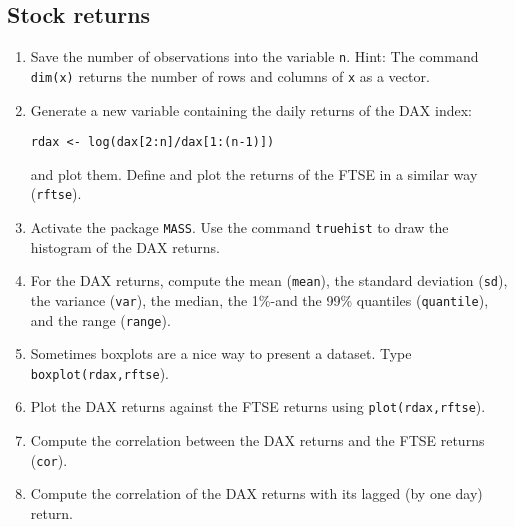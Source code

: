 \documentclass{article}
\begin{document}
\subsection{Stock returns}

\begin{enumerate}\setlength{\itemsep}{-1pt}
\item Save the number of observations into the variable \texttt{n}. Hint: The command \texttt{dim(x)} returns the number of rows and columns of \texttt{x} as a vector.
\item Generate a new variable containing the daily returns of the DAX index:

    \texttt{rdax <- log(dax[2:n]/dax[1:(n-1)])}

     and plot them. Define and plot the returns of the FTSE in a similar way (\texttt{rftse}).

\item Activate the package \texttt{MASS}. Use the command \texttt{truehist} to draw the histogram of the DAX returns.

\item For the DAX returns, compute the mean (\texttt{mean}), the standard deviation (\texttt{sd}), the variance (\texttt{var}), the median, the 1\%-and the 99\% quantiles (\texttt{quantile}), and the range (\texttt{range}).

\item Sometimes boxplots are a nice way to present a dataset. Type \texttt{boxplot(rdax,rftse}).

\item Plot the DAX returns against the FTSE returns using \texttt{plot(rdax,rftse}).

\item Compute the correlation between the DAX returns and the FTSE returns (\texttt{cor}).

\item Compute the correlation of the DAX returns with its lagged (by one day) return.
\end{enumerate}
\end{document}
